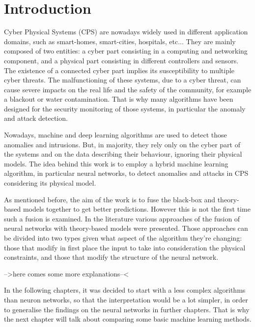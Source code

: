 \chapter{Introduction} \label{chap:intro}

Cyber Physical Systems (CPS) are nowadays widely used in different application domains, such as smart-homes, smart-cities, hospitals, etc... They are mainly composed of two entities: a cyber part consisting in a computing and networking component, and a physical part consisting in different controllers and sensors. The existence of a connected cyber part implies its susceptibility to multiple cyber threats. The malfunctioning of these systems, due to a cyber threat, can cause severe impacts on the real life and the safety of the community, for example a blackout or water contamination. That is why many algorithms have been designed for the security monitoring of those systems, in particular the anomaly and attack detection.

Nowadays, machine and deep learning algorithms are used to detect those anomalies and intrusions. But, in majority, they rely only on the cyber part of the systems and on the data describing their behaviour, ignoring their physical models. The idea behind this work is to employ a hybrid machine learning algorithm, in particular neural networks, to detect anomalies and attacks in CPS considering its physical model.



As mentioned before, the aim of the work is to fuse the black-box and theory-based models together to get better predictions. However this is not the first time such a fusion is examined. In the literature various approaches of the fusion of neural networks with theory-based models were presented. Those approaches can be divided into two types given what aspect of the algorithm they're changing: those that modify in first place the input to take into consideration the physical constraints, and those that modify the structure of the neural network.

-->here comes some more explanations--<

In the following chapters, it was decided to start with a less complex algorithms than neuron networks, so that the interpretation would be a lot simpler, in order to generalise the findings on the neural networks in further chapters. That is why the next chapter will talk about comparing some basic machine learning methods.

